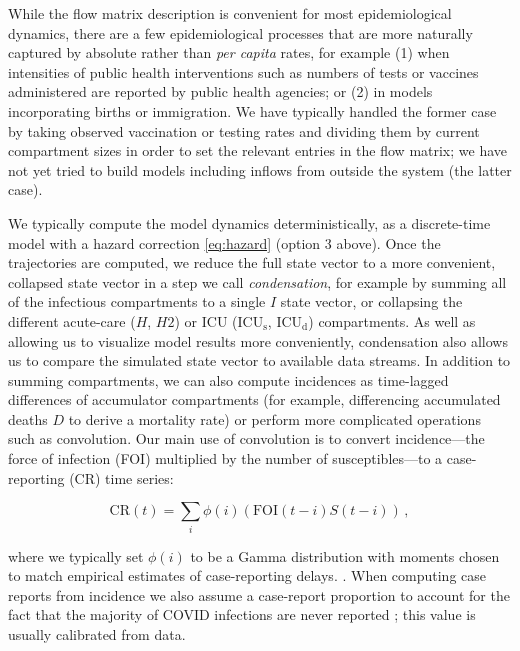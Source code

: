 \documentclass[12pt]{article}\usepackage[]{graphicx}\usepackage[]{color}
\begin{document}
While the flow matrix description is convenient for most epidemiological dynamics, there are a few epidemiological processes that are more naturally captured by absolute rather than \emph{per capita} rates, for example (1) when intensities of public health interventions such as numbers of tests or vaccines administered are reported by public health agencies; or (2) in models incorporating births or immigration.
We have typically handled the former case by taking observed vaccination or testing rates and dividing them by current compartment sizes in order to set the relevant entries in the flow matrix; we have not yet tried to build models including inflows from outside the system (the latter case).

We typically compute the model dynamics deterministically, as a discrete-time model with a hazard correction \eqref{eq:hazard} (option 3 above).  Once the trajectories are computed, we reduce the full state vector to a more convenient, collapsed state vector in a step we call \emph{condensation}, for example by summing all of the infectious compartments to a single $I$ state vector, or collapsing the different acute-care ($H$, $H2$) or ICU ($\textrm{ICU}_\textrm{s}$, $\textrm{ICU}_\textrm{d}$)
compartments.
As well as allowing us to visualize model results more conveniently, condensation also allows us to compare the simulated state vector to available data streams.
In addition to summing compartments, we can also compute incidences as time-lagged differences of accumulator compartments (for example, differencing accumulated deaths $D$ to derive a mortality rate) or perform more complicated operations such as convolution. 
Our main use of convolution is to convert incidence---the force of infection (FOI) multiplied by the number of susceptibles---to a case-reporting (CR) time series: 
\begin{linenomath*}
\begin{equation}\label{eq:CR}
\textrm{CR}(t) = \sum_i \phi(i) (\textrm{FOI}(t-i) S(t-i))\,,
\end{equation}
\end{linenomath*}
where we typically set $\phi(i)$ to be a Gamma distribution with
moments chosen to match empirical estimates of case-reporting delays.
.
When computing case reports from incidence we also assume a case-report proportion  to account for the fact that the majority of COVID infections are never reported \cite{Doug+2020}; this value is usually calibrated from data.
\end{document}
